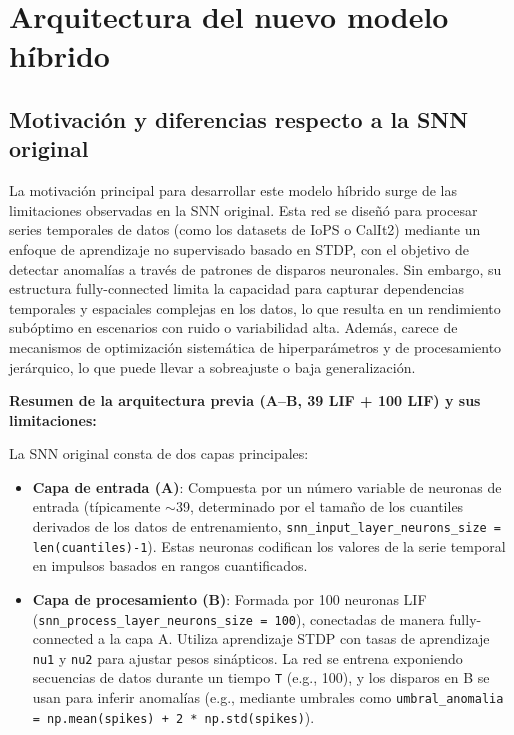 \section{Arquitectura del nuevo modelo híbrido}

\subsection{ Motivación y diferencias respecto a la SNN original}

La motivación principal para desarrollar este modelo híbrido surge de las limitaciones observadas en la SNN original. Esta red se diseñó para procesar series temporales de datos (como los datasets de IoPS o CalIt2) mediante un enfoque de aprendizaje no supervisado basado en STDP, con el objetivo de detectar anomalías a través de patrones de disparos neuronales. Sin embargo, su estructura fully-connected limita la capacidad para capturar dependencias temporales y espaciales complejas en los datos, lo que resulta en un rendimiento subóptimo en escenarios con ruido o variabilidad alta. Además, carece de mecanismos de optimización sistemática de hiperparámetros y de procesamiento jerárquico, lo que puede llevar a sobreajuste o baja generalización.

\textbf{Resumen de la arquitectura previa (A--B, 39 LIF + 100 LIF) y sus limitaciones:}

La SNN original consta de dos capas principales:
\begin{itemize}
    \item \textbf{Capa de entrada (A)}: Compuesta por un número variable de neuronas de entrada (típicamente $\sim$39, determinado por el tamaño de los cuantiles derivados de los datos de entrenamiento, \texttt{snn\_input\_layer\_neurons\_size = len(cuantiles)-1}). Estas neuronas codifican los valores de la serie temporal en impulsos basados en rangos cuantificados.
    \item \textbf{Capa de procesamiento (B)}: Formada por 100 neuronas LIF (\texttt{snn\_process\_layer\_neurons\_size = 100}), conectadas de manera fully-connected a la capa A. Utiliza aprendizaje STDP con tasas de aprendizaje \texttt{nu1} y \texttt{nu2} para ajustar pesos sinápticos. La red se entrena exponiendo secuencias de datos durante un tiempo \texttt{T} (e.g., 100), y los disparos en B se usan para inferir anomalías (e.g., mediante umbrales como \texttt{umbral\_anomalia = np.mean(spikes) + 2 * np.std(spikes)}).
\end{itemize}

